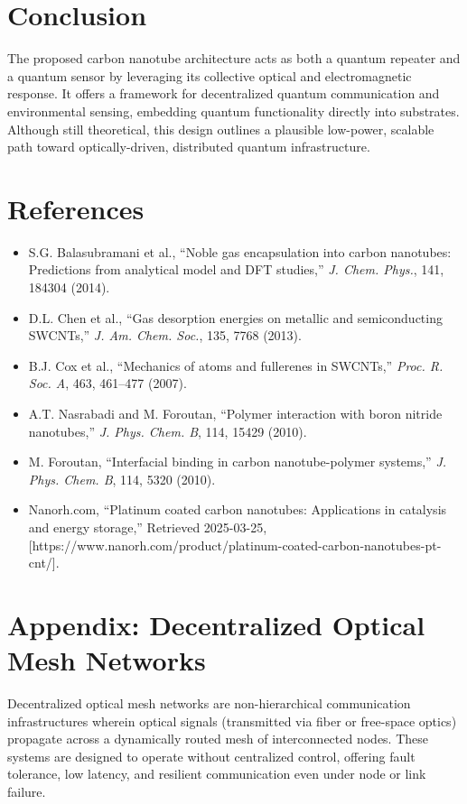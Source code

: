 \documentclass[11pt]{article}
\begin{document}
	\section{Conclusion}
	The proposed carbon nanotube architecture acts as both a quantum repeater and a quantum sensor by leveraging its collective optical and electromagnetic response. It offers a framework for decentralized quantum communication and environmental sensing, embedding quantum functionality directly into substrates. Although still theoretical, this design outlines a plausible low-power, scalable path toward optically-driven, distributed quantum infrastructure.
	
	\section{References}
	\begin{itemize}
		\item S.G. Balasubramani et al., ``Noble gas encapsulation into carbon nanotubes: Predictions from analytical model and DFT studies,'' \textit{J. Chem. Phys.}, 141, 184304 (2014).
		\item D.L. Chen et al., ``Gas desorption energies on metallic and semiconducting SWCNTs,'' \textit{J. Am. Chem. Soc.}, 135, 7768 (2013).
		\item B.J. Cox et al., ``Mechanics of atoms and fullerenes in SWCNTs,'' \textit{Proc. R. Soc. A}, 463, 461--477 (2007).
		\item A.T. Nasrabadi and M. Foroutan, ``Polymer interaction with boron nitride nanotubes,'' \textit{J. Phys. Chem. B}, 114, 15429 (2010).
		\item M. Foroutan, ``Interfacial binding in carbon nanotube-polymer systems,'' \textit{J. Phys. Chem. B}, 114, 5320 (2010).
		\item Nanorh.com, ``Platinum coated carbon nanotubes: Applications in catalysis and energy storage,'' Retrieved 2025-03-25, [https://www.nanorh.com/product/platinum-coated-carbon-nanotubes-pt-cnt/].
	\end{itemize}
	
	\section*{Appendix: Decentralized Optical Mesh Networks}
	Decentralized optical mesh networks are non-hierarchical communication infrastructures wherein optical signals (transmitted via fiber or free-space optics) propagate across a dynamically routed mesh of interconnected nodes. These systems are designed to operate without centralized control, offering fault tolerance, low latency, and resilient communication even under node or link failure.
	
\end{document}
